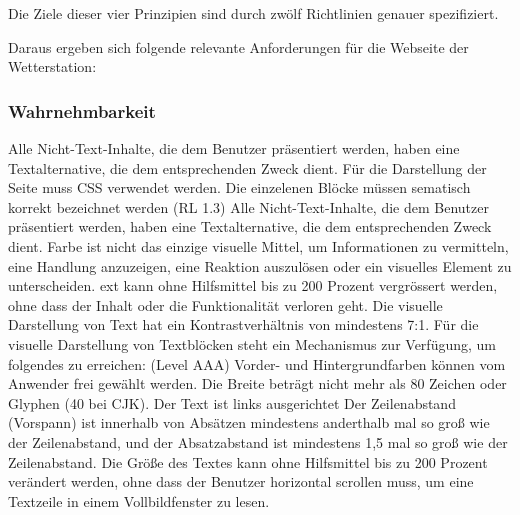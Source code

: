Die Ziele dieser vier Prinzipien sind durch zwölf Richtlinien genauer spezifiziert.






Daraus ergeben sich folgende relevante Anforderungen für die Webseite der Wetterstation:


\subsubsection*{Wahrnehmbarkeit}
Alle Nicht-Text-Inhalte, die dem Benutzer präsentiert werden, haben eine Textalternative, die dem entsprechenden Zweck dient.
Für die Darstellung der Seite muss CSS verwendet werden. Die einzelenen Blöcke müssen sematisch korrekt bezeichnet werden (RL 1.3)
Alle Nicht-Text-Inhalte, die dem Benutzer präsentiert werden, haben eine Textalternative, die dem entsprechenden Zweck dient.
Farbe ist nicht das einzige visuelle Mittel, um Informationen zu vermitteln, eine Handlung anzuzeigen, eine Reaktion auszulösen oder ein visuelles Element zu unterscheiden. ext kann ohne Hilfsmittel bis zu 200 Prozent vergrössert werden, ohne dass der Inhalt oder die Funktionalität verloren geht. Die visuelle Darstellung von Text hat ein Kontrastverhältnis von mindestens 7:1.
Für die visuelle Darstellung von Textblöcken steht ein Mechanismus zur Verfügung, um folgendes zu erreichen: (Level AAA)
Vorder- und Hintergrundfarben können vom Anwender frei gewählt werden.
Die Breite beträgt nicht mehr als 80 Zeichen oder Glyphen (40 bei CJK).
Der Text ist links ausgerichtet
Der Zeilenabstand (Vorspann) ist innerhalb von Absätzen mindestens anderthalb mal so groß wie der Zeilenabstand, und der Absatzabstand ist mindestens 1,5 mal so groß wie der Zeilenabstand.
Die Größe des Textes kann ohne Hilfsmittel bis zu 200 Prozent verändert werden, ohne dass der Benutzer horizontal scrollen muss, um eine Textzeile in einem Vollbildfenster zu lesen.

